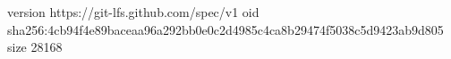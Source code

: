 version https://git-lfs.github.com/spec/v1
oid sha256:4cb94f4e89baceaa96a292bb0e0c2d4985c4ca8b29474f5038c5d9423ab9d805
size 28168
